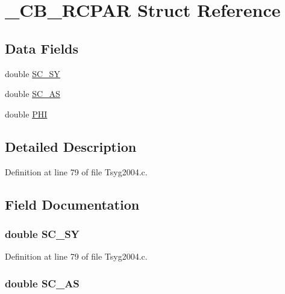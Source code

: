 \hypertarget{struct___c_b___r_c_p_a_r}{
\section{\_\-CB\_\-RCPAR Struct Reference}
\label{struct___c_b___r_c_p_a_r}
}
\subsection*{Data Fields}
\begin{CompactItemize}
\item 
double \hyperlink{struct___c_b___r_c_p_a_r_a409bcc6077e57d83a88020286993cce}{SC\_\-SY}
\item 
double \hyperlink{struct___c_b___r_c_p_a_r_4973a953d8c39d5be8e952d041b6adf4}{SC\_\-AS}
\item 
double \hyperlink{struct___c_b___r_c_p_a_r_38d8f926202c5208f4ea151b52bfe3ef}{PHI}
\end{CompactItemize}


\subsection{Detailed Description}


Definition at line 79 of file Tsyg2004.c.

\subsection{Field Documentation}
\hypertarget{struct___c_b___r_c_p_a_r_a409bcc6077e57d83a88020286993cce}{
\subsubsection[{SC\_\-SY}]{\setlength{\rightskip}{0pt plus 5cm}double {\bf SC\_\-SY}}}
\label{struct___c_b___r_c_p_a_r_a409bcc6077e57d83a88020286993cce}




Definition at line 79 of file Tsyg2004.c.\hypertarget{struct___c_b___r_c_p_a_r_4973a953d8c39d5be8e952d041b6adf4}{
\subsubsection[{SC\_\-AS}]{\setlength{\rightskip}{0pt plus 5cm}double {\bf SC\_\-AS}}}
\label{struct___c_b___r_c_p_a_r_4973a953d8c39d5be8e952d041b6adf4}




